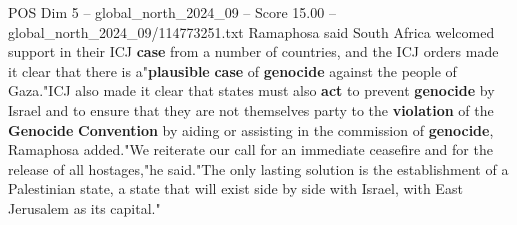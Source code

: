 \begin{textsample}{POS Dim 5 – global\_north\_2024\_09 – Score 15.00 – global\_north\_2024\_09/114773251.txt}
Ramaphosa said South Africa welcomed support in their ICJ \textbf{case} from a number of countries, and the ICJ orders made it clear that there is a"\textbf{plausible} \textbf{case} of \textbf{genocide} against the people of Gaza."ICJ also made it clear that states must also \textbf{act} to prevent \textbf{genocide} by Israel and to ensure that they are not themselves party to the \textbf{violation} of the \textbf{Genocide} \textbf{Convention} by aiding or assisting in the commission of \textbf{genocide}, Ramaphosa added."We reiterate our call for an immediate ceasefire and for the release of all hostages,"he said."The only lasting solution is the establishment of a Palestinian state, a state that will exist side by side with Israel, with East Jerusalem as its capital."

\end{textsample}
